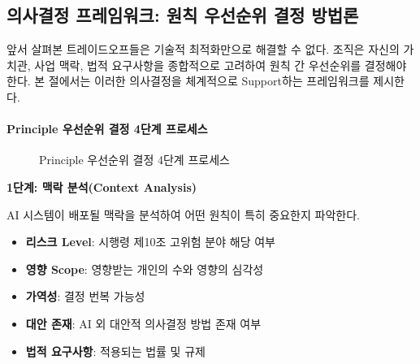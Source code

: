\subsection{의사결정 프레임워크: 원칙 우선순위 결정 방법론}
\label{sec:3.2.4}

앞서 살펴본 트레이드오프들은 기술적 최적화만으로 해결할 수 없다. 
조직은 자신의 가치관, 사업 맥락, 법적 요구사항을 종합적으로 고려하여
원칙 간 우선순위를 결정해야 한다.\cite{friedman2019value, floridi2022unified} 
본 절에서는 이러한 의사결정을 체계적으로 Support하는 프레임워크를 제시한다.


\paragraph{Principle 우선순위 결정 4단계 프로세스}

\begin{figure}[htbp]
\centering
{}
\caption{Principle 우선순위 결정 4단계 프로세스}
\label{fig:priority_process}
\end{figure}

\textbf{1단계: 맥락 분석(Context Analysis)}

AI 시스템이 배포될 맥락을 분석하여 어떤 원칙이 특히 중요한지 파악한다.

\begin{itemize}
 \item \textbf{리스크 Level}: 시행령 제10조 고위험 분야 해당 여부
 \item \textbf{영향 Scope}: 영향받는 개인의 수와 영향의 심각성
 \item \textbf{가역성}: 결정 번복 가능성
 \item \textbf{대안 존재}: AI 외 대안적 의사결정 방법 존재 여부
 \item \textbf{법적 요구사항}: 적용되는 법률 및 규제
\end{itemize}

